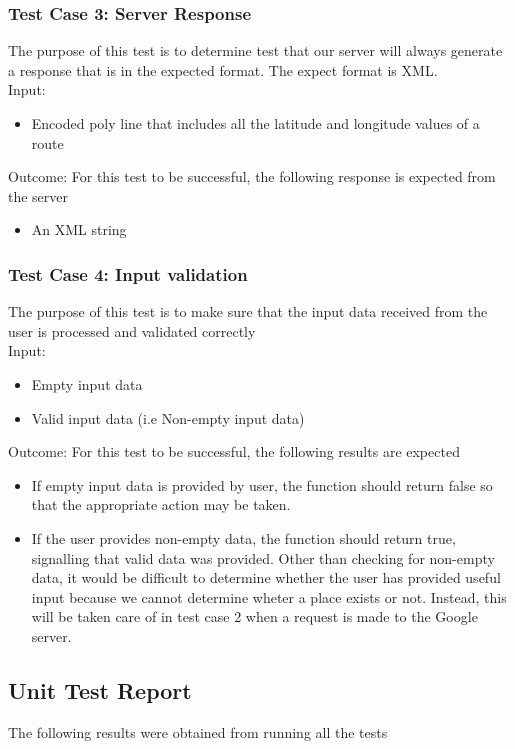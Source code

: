 \documentclass[a4paper,12pt]{article}
\begin{document}
\subsubsection{Test Case 3: Server Response}
The purpose of this test is to determine test that our server will always generate a response that is in the expected format. The expect format is XML.
\\Input: \begin{itemize}
\item Encoded poly line that includes all the latitude and longitude values of a route
\end{itemize}
Outcome: For this test to be successful, the following response is expected from the server
\begin{itemize}
\item An XML string
\end{itemize}

\subsubsection{Test Case 4: Input validation}
The purpose of this test is to make sure that the input data received from the user is processed and validated correctly
\\Input: \begin{itemize}
\item Empty input data
\item Valid input data (i.e Non-empty input data)
\end{itemize}
Outcome: For this test to be successful, the following results are expected
\begin{itemize}
\item If empty input data is provided by user, the function should return false so that the appropriate action may be taken.
\item If the user provides non-empty data, the function should return true, signalling that valid data was provided. Other than checking for non-empty data, it would be difficult to determine whether the user has provided useful input because we cannot determine wheter a place exists or not. Instead, this will be taken care of in test case 2 when a request is made to the Google server.
\end{itemize}
\subsection{Unit Test Report}
The following results were obtained from running all the tests
\end{document}
